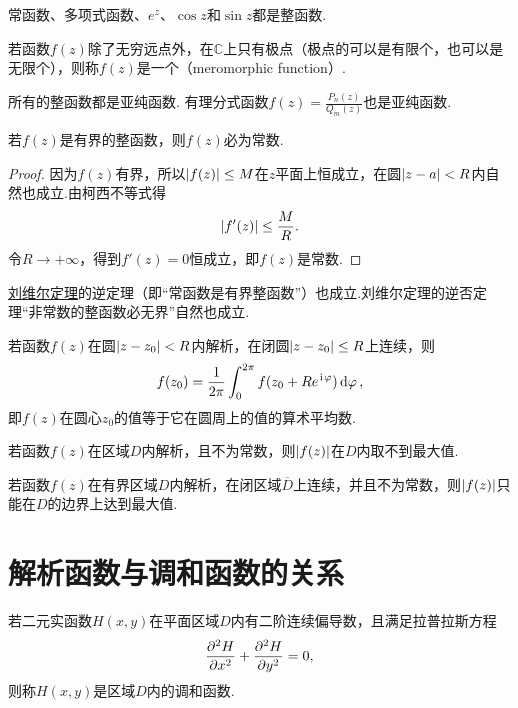 \begin{example}
常函数、多项式函数、\(e^z\)、\(\cos z\)和\(\sin z\)都是整函数.
\end{example}

\begin{definition}
若函数\(f(z)\)除了无穷远点外，在\(\mathbb{C}\)上只有极点（极点的可以是有限个，也可以是无限个），则称\(f(z)\)是一个（meromorphic function）.
\end{definition}

\begin{example}
所有的整函数都是亚纯函数.
有理分式函数\(f(z) = \frac{P_n(z)}{Q_m(z)}\)也是亚纯函数.
\end{example}

\begin{theorem}[刘维尔定理]\label{theorem:解析函数的积分表示.刘维尔定理}
若\(f(z)\)是有界的整函数，则\(f(z)\)必为常数.
\begin{proof}
因为\(f(z)\)有界，所以\(\abs{f(z)} \leq M\)在\(z\)平面上恒成立，在圆\(\abs{z-a}<R\)内自然也成立.由柯西不等式得\[
\abs{f'(z)} \leq \frac{M}{R}.
\]令\(R\to+\infty\)，得到\(f'(z)=0\)恒成立，即\(f(z)\)是常数.
\end{proof}
\end{theorem}
\hyperref[theorem:解析函数的积分表示.刘维尔定理]{刘维尔定理}的逆定理（即“常函数是有界整函数”）也成立.刘维尔定理的逆否定理“非常数的整函数必无界”自然也成立.

\begin{theorem}[解析函数的平均值定理]\label{theorem:解析函数的积分表示.平均值定理}
若函数\(f(z)\)在圆\(\abs{z-z_0}<R\)内解析，在闭圆\(\abs{z-z_0} \leq R\)上连续，则\[
f(z_0) = \frac{1}{2\pi} \int_0^{2\pi} f(z_0+Re^{\kern1pt\mathrm{i}\kern1pt\varphi}) \dd{\varphi},
\]即\(f(z)\)在圆心\(z_0\)的值等于它在圆周上的值的算术平均数.
\end{theorem}

\begin{theorem}[最大模定理]\label{theorem:解析函数的积分表示.最大模定理}
若函数\(f(z)\)在区域\(D\)内解析，且不为常数，则\(\abs{f(z)}\)在\(D\)内取不到最大值.
\end{theorem}

\begin{corollary}\label{theorem:解析函数的积分表示.最大模定理推论}
若函数\(f(z)\)在有界区域\(D\)内解析，在闭区域\(\overline{D}\)上连续，并且不为常数，则\(\abs{f(z)}\)只能在\(D\)的边界上达到最大值.
\end{corollary}

\section{解析函数与调和函数的关系}
\begin{definition}
若二元实函数\(H(x,y)\)在平面区域\(D\)内有二阶连续偏导数，且满足拉普拉斯方程\[
\pdv[2]{H}{x} + \pdv[2]{H}{y} = 0,
\]则称\(H(x,y)\)是区域\(D\)内的调和函数.
\end{definition}

